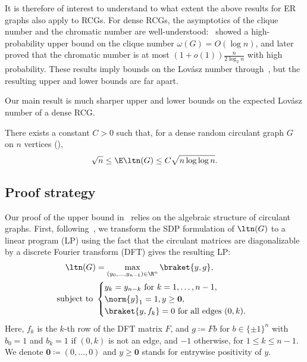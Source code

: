 It is therefore of interest to understand to what extent the above results for ER graphs also apply to RCGs.
For dense RCGs, the asymptotics of the clique number and the chromatic number are well-understood:~\cite{green2005counting} showed a high-probability upper bound on the clique number \(\omega(G) = O(\log n)\), and later~\cite{green2016counting} proved that the chromatic number is at most $(1+o(1)) \frac{n} { 2 \log_2 n}$ with high probability. 
These results imply bounds on the Lovász number through~, but the resulting upper and lower bounds are far apart.

Our main result is much sharper upper and lower bounds on the expected Lovász number of a dense RCG. 
\begin{theorem}
\label{thm:main}
    There exists a constant $C > 0$ such that, for a dense random circulant graph \(G\) on $n$ vertices (),
    \begin{equation}
        \sqrt{n} \leq \E \ltn(G) \leq C \sqrt{n \log \log n}.
    \end{equation}
\end{theorem}

\noindent

\subsection{Proof strategy}
Our proof of the upper bound in~ relies on the algebraic structure of circulant graphs. First, following~\cite{magsino2019linear}, we transform the SDP formulation of \(\ltn(G)\) to a linear program (LP) using the fact that the circulant matrices are diagonalizable by a discrete Fourier transform (DFT)
 gives the resulting LP:
\begin{equation}
\label{eq:first_step}
\begin{aligned}
    \ltn(G) &= \max_{(y_0, \dots, y_{n-1}) \in \R^{n}} \braket{y, g}, \\ \text{ subject to }
    &\begin{cases} y_k = y_{n - k} \text{ for } k = 1,\ldots, n - 1, \\
    \norm{y}_1 = 1,
    y \geq \mathbf{0}, \\
    \braket{y, f_k} = 0\text{ for all edges } (0, k).
    \end{cases}
\end{aligned}
\end{equation}
Here, \(f_k\) is the \(k\)-th row of the DFT matrix \(F\), and \(g \coloneqq Fb\) for \(b \in \{\pm 1\}^{n}\) with $b_0=1$ and \(b_k = 1\) if \((0, k)\) is not an edge, and \(-1\) otherwise, for $1 \le k \le n-1$. We denote \(\mathbf{0} \coloneqq (0, \ldots, 0)\) and \(y \geq \mathbf{0}\) stands for entrywise positivity of \(y\).

